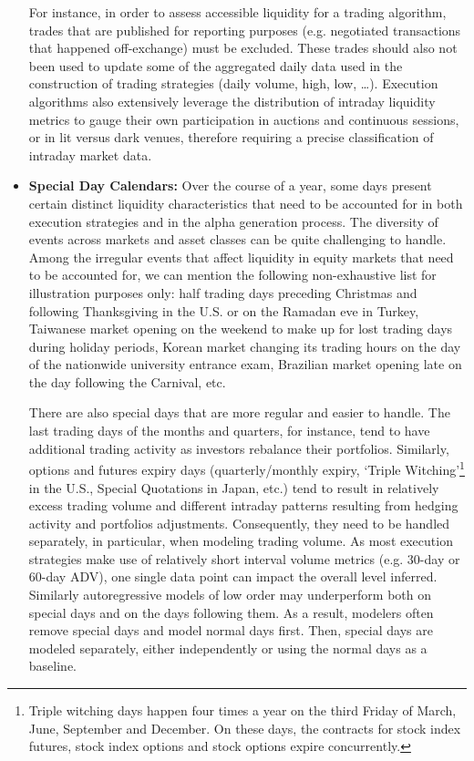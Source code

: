\begin{itemize}
For instance, in order to assess accessible liquidity for a trading algorithm, trades that are published for reporting purposes (e.g. negotiated transactions that happened off-exchange) must be excluded. These trades should also not been used to update some of the aggregated daily data used in the construction of trading strategies (daily volume, high, low, \dots). Execution algorithms also extensively leverage the distribution of intraday liquidity metrics to gauge their own participation in auctions and continuous sessions, or in lit versus dark venues, therefore requiring a precise classification of intraday market data. 


\item \textbf{Special Day Calendars:} Over the course of a year, some days present certain distinct liquidity characteristics that need to be accounted for in both execution strategies and in the alpha generation process. The diversity of events across markets and asset classes can be quite challenging to handle. Among the irregular events that affect liquidity in equity markets that need to be accounted for, we can mention the following non-exhaustive list for illustration purposes only: half trading days preceding Christmas and following Thanksgiving in the U.S. or on the Ramadan eve in Turkey, Taiwanese market opening on the weekend to make up for lost trading days during holiday periods, Korean market changing its trading hours on the day of the nationwide university entrance exam, Brazilian market opening late on the day following the Carnival, etc.


There are also special days that are more regular and easier to handle. The last trading days of the months and quarters, for instance, tend to have additional trading activity as investors rebalance their portfolios. Similarly, options and futures expiry days (quarterly/monthly expiry, `Triple Witching'\footnote{Triple witching days happen four times a year on the third Friday of March, June, September and December. On these days, the contracts for stock index futures, stock index options and stock options expire concurrently.} in the U.S., Special Quotations in Japan, etc.) tend to result in relatively excess trading volume and different intraday patterns resulting from hedging activity and portfolios adjustments. Consequently, they need to be handled separately, in particular, when modeling trading volume. As most execution strategies make use of relatively short interval volume metrics (e.g. 30-day or 60-day ADV), one single data point can impact the overall level inferred. Similarly autoregressive models of low order may underperform both on special days and on the days following them. As a result, modelers often remove special days and model normal days first. Then, special days are modeled separately, either independently or using the normal days as a baseline. 



\end{itemize}
